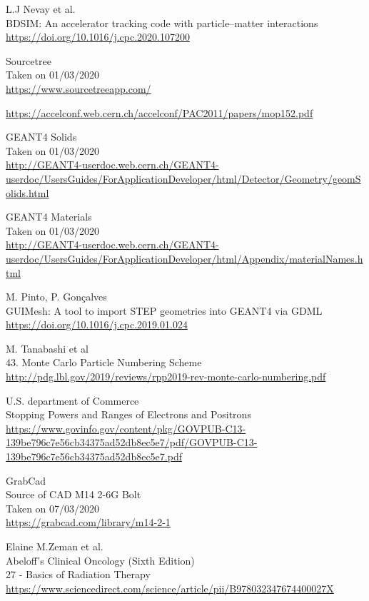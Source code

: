 \documentclass[12pt,a4paper]{article}
\begin{document}
\begin{thebibliography}{1}
		L.J Nevay et al.\\
		BDSIM: An accelerator tracking code with particle–matter interactions\\
		\url{https://doi.org/10.1016/j.cpc.2020.107200}
		
		Sourcetree\\
		Taken on 01/03/2020\\
		\url{https://www.sourcetreeapp.com/}
		
	\url{https://accelconf.web.cern.ch/accelconf/PAC2011/papers/mop152.pdf}
		
	GEANT4 Solids\\
	Taken on 01/03/2020\\
	\url{http://GEANT4-userdoc.web.cern.ch/GEANT4-userdoc/UsersGuides/ForApplicationDeveloper/html/Detector/Geometry/geomSolids.html}
	
	GEANT4 Materials\\
	Taken on 01/03/2020\\
	\url{http://GEANT4-userdoc.web.cern.ch/GEANT4-userdoc/UsersGuides/ForApplicationDeveloper/html/Appendix/materialNames.html}
	
	M. Pinto, P. Gon\c{c}alves\\
	GUIMesh: A tool to import STEP geometries into GEANT4 via GDML\\
	\url{https://doi.org/10.1016/j.cpc.2019.01.024}
		
	M. Tanabashi et al\\
	43. Monte Carlo Particle Numbering Scheme\\
	\url{http://pdg.lbl.gov/2019/reviews/rpp2019-rev-monte-carlo-numbering.pdf}
	
	U.S. department of Commerce\\
	Stopping Powers and Ranges of
	Electrons and Positrons\\
	\url{https://www.govinfo.gov/content/pkg/GOVPUB-C13-139be796c7e56cb34375ad52db8ec5e7/pdf/GOVPUB-C13-139be796c7e56cb34375ad52db8ec5e7.pdf}
	
	GrabCad\\
	Source of CAD M14 2-6G Bolt\\
	Taken on 07/03/2020\\
	\url{https://grabcad.com/library/m14-2-1}

	Elaine M.Zeman et al.\\
	Abeloff's Clinical Oncology (Sixth Edition)\\
	27 - Basics of Radiation Therapy\\
	\url{https://www.sciencedirect.com/science/article/pii/B978032347674400027X}
	

\end{thebibliography}
\end{document}
